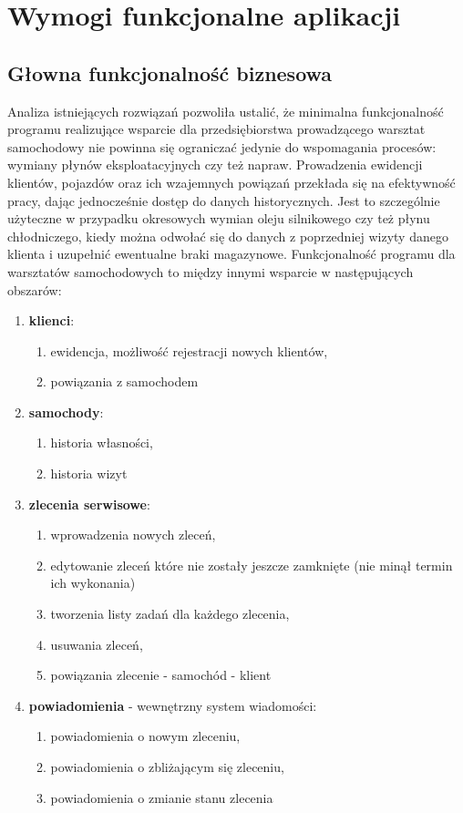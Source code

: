 \chapter{Wymogi funkcjonalne aplikacji}
\label{chapter:app_functional_requirements}

	\section{Głowna funkcjonalność biznesowa}
		Analiza istniejących rozwiązań pozwoliła ustalić, że minimalna funkcjonalność programu realizujące wsparcie dla przedsiębiorstwa prowadzącego warsztat samochodowy nie powinna się ograniczać jedynie do wspomagania procesów: wymiany płynów eksploatacyjnych czy też napraw. Prowadzenia ewidencji klientów, pojazdów oraz ich wzajemnych powiązań przekłada się na efektywność pracy, dając jednocześnie dostęp do danych historycznych. Jest to szczególnie użyteczne w przypadku okresowych wymian oleju silnikowego czy też płynu chłodniczego, kiedy można odwołać się do danych z poprzedniej wizyty danego klienta i uzupełnić ewentualne braki magazynowe. Funkcjonalność programu dla warsztatów samochodowych to między innymi wsparcie w następujących obszarów:
		\begin{enumerate}
			\item \textbf{klienci}:
			\begin{enumerate}
				\item ewidencja, możliwość rejestracji nowych klientów,
				\item powiązania z samochodem
			\end{enumerate}
			\item \textbf{samochody}:
			\begin{enumerate}
				\item historia własności,
				\item historia wizyt
			\end{enumerate}
			\item \textbf{zlecenia serwisowe}:
			\begin{enumerate}
				\item wprowadzenia nowych zleceń,
				\item edytowanie zleceń które nie zostały jeszcze zamknięte (nie minął termin ich wykonania)
				\item tworzenia listy zadań dla każdego zlecenia,
				\item usuwania zleceń,
				\item powiązania zlecenie - samochód - klient
			\end{enumerate}
			\item \textbf{powiadomienia} - wewnętrzny system wiadomości:
			\begin{enumerate}
				\item powiadomienia o nowym zleceniu,
				\item powiadomienia o zbliżającym się zleceniu,
				\item powiadomienia o zmianie stanu zlecenia
			\end{enumerate}
		\end{enumerate}
	
